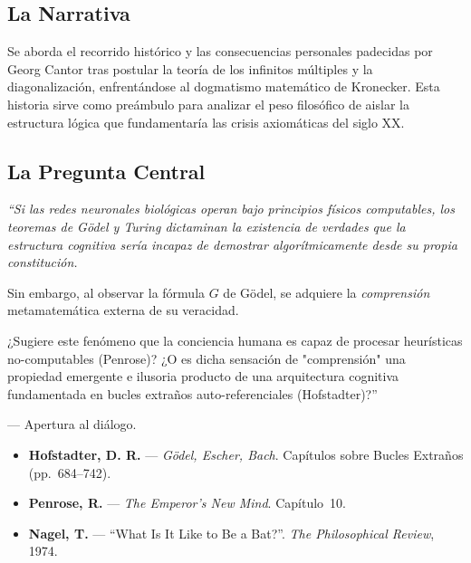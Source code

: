 \documentclass[11pt, letterpaper]{article}
\begin{document}
\vspace{0.5em}

\subsection*{La Narrativa}
Se aborda el recorrido hist\'orico y las consecuencias personales padecidas por Georg Cantor tras postular la teor\'ia de los infinitos m\'ultiples y la diagonalizaci\'on, enfrent\'andose al dogmatismo matem\'atico de Kronecker. Esta historia sirve como pre\'ambulo para analizar el peso filos\'ofico de aislar la estructura l\'ogica que fundamentar\'ia las crisis axiom\'aticas del siglo XX.

\subsection*{La Pregunta Central}
\begin{tcolorbox}[colback=outdoorgreen!5, colframe=outdoorgreen, boxrule=0.7pt, left=8pt, right=8pt, top=6pt, bottom=6pt]
{\itshape ``Si las redes neuronales biol\'ogicas operan bajo principios f\'isicos computables, los teoremas de G\"odel y Turing dictaminan la existencia de verdades que la estructura cognitiva ser\'ia incapaz de demostrar algor\'itmicamente desde su propia constituci\'on.

Sin embargo, al observar la f\'ormula $G$ de G\"odel, se adquiere la \emph{comprensi\'on} metamatem\'atica externa de su veracidad.

¿Sugiere este fen\'omeno que la conciencia humana es capaz de procesar heur\'isticas no-computables (Penrose)? ¿O es dicha sensaci\'on de "comprensi\'on" una propiedad emergente e ilusoria producto de una arquitectura cognitiva fundamentada en bucles extra\~nos auto-referenciales (Hofstadter)?''}

\medskip
\hfill --- Apertura al di\'alogo.
\end{tcolorbox}

\begin{lecturas}
\begin{itemize}
  \item[$(\star)$] \textbf{Hofstadter, D. R.} --- \emph{G\"odel, Escher, Bach}. Cap\'itulos sobre Bucles Extra\~nos (pp.\ 684--742).
  \item \textbf{Penrose, R.} --- \emph{The Emperor's New Mind}. Cap\'itulo~10.
  \item \textbf{Nagel, T.} --- ``What Is It Like to Be a Bat?''. \textit{The Philosophical Review}, 1974.
\end{itemize}
\end{lecturas}
\end{document}
